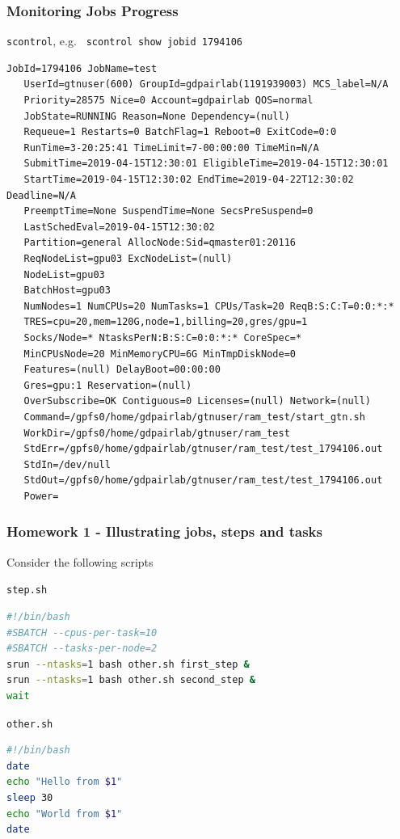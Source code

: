 \documentclass{beamer}
\newcommand{\code}[1]{\colorbox{codegray}{\texttt{#1}}}
\begin{document}
\begin{frame}[fragile]
\frametitle{Monitoring Jobs Progress}
\code{scontrol}, e.g. \code{ scontrol show jobid 1794106}
\begingroup
\tiny
\begin{lstlisting}[backgroundcolor = \color{codegray},showstringspaces=false]
JobId=1794106 JobName=test
   UserId=gtnuser(600) GroupId=gdpairlab(1191939003) MCS_label=N/A
   Priority=28575 Nice=0 Account=gdpairlab QOS=normal
   JobState=RUNNING Reason=None Dependency=(null)
   Requeue=1 Restarts=0 BatchFlag=1 Reboot=0 ExitCode=0:0
   RunTime=3-20:25:41 TimeLimit=7-00:00:00 TimeMin=N/A
   SubmitTime=2019-04-15T12:30:01 EligibleTime=2019-04-15T12:30:01
   StartTime=2019-04-15T12:30:02 EndTime=2019-04-22T12:30:02 Deadline=N/A
   PreemptTime=None SuspendTime=None SecsPreSuspend=0
   LastSchedEval=2019-04-15T12:30:02
   Partition=general AllocNode:Sid=qmaster01:20116
   ReqNodeList=gpu03 ExcNodeList=(null)
   NodeList=gpu03
   BatchHost=gpu03
   NumNodes=1 NumCPUs=20 NumTasks=1 CPUs/Task=20 ReqB:S:C:T=0:0:*:*
   TRES=cpu=20,mem=120G,node=1,billing=20,gres/gpu=1
   Socks/Node=* NtasksPerN:B:S:C=0:0:*:* CoreSpec=*
   MinCPUsNode=20 MinMemoryCPU=6G MinTmpDiskNode=0
   Features=(null) DelayBoot=00:00:00
   Gres=gpu:1 Reservation=(null)
   OverSubscribe=OK Contiguous=0 Licenses=(null) Network=(null)
   Command=/gpfs0/home/gdpairlab/gtnuser/ram_test/start_gtn.sh
   WorkDir=/gpfs0/home/gdpairlab/gtnuser/ram_test
   StdErr=/gpfs0/home/gdpairlab/gtnuser/ram_test/test_1794106.out
   StdIn=/dev/null
   StdOut=/gpfs0/home/gdpairlab/gtnuser/ram_test/test_1794106.out
   Power=
\end{lstlisting}
\endgroup
\end{frame}




\begin{frame}[fragile]
\frametitle{Homework 1 - Illustrating jobs, steps and tasks}
Consider the following scripts

\medskip
\code{step.sh}
\begingroup
\small
\begin{lstlisting}[backgroundcolor = \color{codegray},showstringspaces=false, language=Bash]
#!/bin/bash
#SBATCH --cpus-per-task=10
#SBATCH --tasks-per-node=2
srun --ntasks=1 bash other.sh first_step &
srun --ntasks=1 bash other.sh second_step &
wait
\end{lstlisting}
\endgroup


\medskip
\code{other.sh}
\begingroup
\small
\begin{lstlisting}[backgroundcolor = \color{codegray},showstringspaces=false, language=Bash]
#!/bin/bash
date
echo "Hello from $1"
sleep 30
echo "World from $1"
date
\end{lstlisting}
\endgroup
\end{frame}
\end{document}
